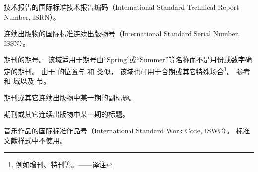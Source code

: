 \begin{fieldlist}


技术报告的国际标准技术报告编码（International Standard Technical Report Number,  ISRN）。




连续出版物的国际标准连续出版物号（International Standard Serial Number,  ISSN）。




期刊的期号。
该域适用于期号由“Spring”或“Summer”等名称而不是月份或数字确定的期刊。
由于  的位置与  和  类似，
该域也可用于合期或其它特殊场合\footnote{例如增刊、特刊等。——译注}。
参考  和  域以及  节。




期刊或其它连续出版物中某一期的副标题。




期刊或其它连续出版物中某一期的标题。




音乐作品的国际标准作品号（International Standard Work Code,  ISWC）。
标准文献样式中不使用。


\end{fieldlist}
